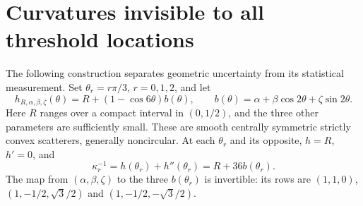 \section{Curvatures invisible to all threshold locations}
\label{sec:g-inverse}
The following construction separates geometric uncertainty from its
statistical measurement. Set $\theta_r=r\pi/3$, $r=0,1,2$, and let
\begin{equation}\label{eq:g-isogap-family}
 h_{R,\alpha,\beta,\zeta}(\theta)
   =R+(1-\cos6\theta)b(\theta),\qquad
 b(\theta)=\alpha+\beta\cos2\theta+\zeta\sin2\theta.
\end{equation}
Here $R$ ranges over a compact interval in $(0,1/2)$, and the three
other parameters are sufficiently small. These are smooth centrally
symmetric strictly convex scatterers, generally noncircular. At each
$\theta_r$ and its opposite, $h=R$, $h'=0$, and
\begin{equation}\label{eq:g-contact-curvatures}
       \kappa_r^{-1}=h(\theta_r)+h''(\theta_r)
                     =R+36b(\theta_r).
\end{equation}
The map from $(\alpha,\beta,\zeta)$ to the three $b(\theta_r)$ is
invertible: its rows are $(1,1,0)$, $(1,-1/2,\sqrt3/2)$ and
$(1,-1/2,-\sqrt3/2)$.

